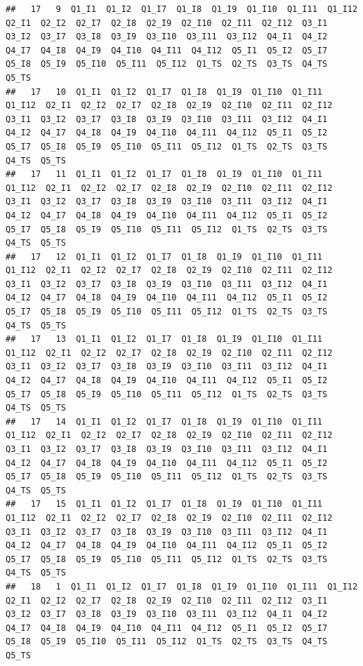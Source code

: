 \documentclass[
]{book}
\begin{document}
\begin{verbatim}
##   17   9  Q1_I1  Q1_I2  Q1_I7  Q1_I8  Q1_I9  Q1_I10  Q1_I11  Q1_I12  Q2_I1  Q2_I2  Q2_I7  Q2_I8  Q2_I9  Q2_I10  Q2_I11  Q2_I12  Q3_I1  Q3_I2  Q3_I7  Q3_I8  Q3_I9  Q3_I10  Q3_I11  Q3_I12  Q4_I1  Q4_I2  Q4_I7  Q4_I8  Q4_I9  Q4_I10  Q4_I11  Q4_I12  Q5_I1  Q5_I2  Q5_I7  Q5_I8  Q5_I9  Q5_I10  Q5_I11  Q5_I12  Q1_TS  Q2_TS  Q3_TS  Q4_TS  Q5_TS
##   17   10  Q1_I1  Q1_I2  Q1_I7  Q1_I8  Q1_I9  Q1_I10  Q1_I11  Q1_I12  Q2_I1  Q2_I2  Q2_I7  Q2_I8  Q2_I9  Q2_I10  Q2_I11  Q2_I12  Q3_I1  Q3_I2  Q3_I7  Q3_I8  Q3_I9  Q3_I10  Q3_I11  Q3_I12  Q4_I1  Q4_I2  Q4_I7  Q4_I8  Q4_I9  Q4_I10  Q4_I11  Q4_I12  Q5_I1  Q5_I2  Q5_I7  Q5_I8  Q5_I9  Q5_I10  Q5_I11  Q5_I12  Q1_TS  Q2_TS  Q3_TS  Q4_TS  Q5_TS
##   17   11  Q1_I1  Q1_I2  Q1_I7  Q1_I8  Q1_I9  Q1_I10  Q1_I11  Q1_I12  Q2_I1  Q2_I2  Q2_I7  Q2_I8  Q2_I9  Q2_I10  Q2_I11  Q2_I12  Q3_I1  Q3_I2  Q3_I7  Q3_I8  Q3_I9  Q3_I10  Q3_I11  Q3_I12  Q4_I1  Q4_I2  Q4_I7  Q4_I8  Q4_I9  Q4_I10  Q4_I11  Q4_I12  Q5_I1  Q5_I2  Q5_I7  Q5_I8  Q5_I9  Q5_I10  Q5_I11  Q5_I12  Q1_TS  Q2_TS  Q3_TS  Q4_TS  Q5_TS
##   17   12  Q1_I1  Q1_I2  Q1_I7  Q1_I8  Q1_I9  Q1_I10  Q1_I11  Q1_I12  Q2_I1  Q2_I2  Q2_I7  Q2_I8  Q2_I9  Q2_I10  Q2_I11  Q2_I12  Q3_I1  Q3_I2  Q3_I7  Q3_I8  Q3_I9  Q3_I10  Q3_I11  Q3_I12  Q4_I1  Q4_I2  Q4_I7  Q4_I8  Q4_I9  Q4_I10  Q4_I11  Q4_I12  Q5_I1  Q5_I2  Q5_I7  Q5_I8  Q5_I9  Q5_I10  Q5_I11  Q5_I12  Q1_TS  Q2_TS  Q3_TS  Q4_TS  Q5_TS
##   17   13  Q1_I1  Q1_I2  Q1_I7  Q1_I8  Q1_I9  Q1_I10  Q1_I11  Q1_I12  Q2_I1  Q2_I2  Q2_I7  Q2_I8  Q2_I9  Q2_I10  Q2_I11  Q2_I12  Q3_I1  Q3_I2  Q3_I7  Q3_I8  Q3_I9  Q3_I10  Q3_I11  Q3_I12  Q4_I1  Q4_I2  Q4_I7  Q4_I8  Q4_I9  Q4_I10  Q4_I11  Q4_I12  Q5_I1  Q5_I2  Q5_I7  Q5_I8  Q5_I9  Q5_I10  Q5_I11  Q5_I12  Q1_TS  Q2_TS  Q3_TS  Q4_TS  Q5_TS
##   17   14  Q1_I1  Q1_I2  Q1_I7  Q1_I8  Q1_I9  Q1_I10  Q1_I11  Q1_I12  Q2_I1  Q2_I2  Q2_I7  Q2_I8  Q2_I9  Q2_I10  Q2_I11  Q2_I12  Q3_I1  Q3_I2  Q3_I7  Q3_I8  Q3_I9  Q3_I10  Q3_I11  Q3_I12  Q4_I1  Q4_I2  Q4_I7  Q4_I8  Q4_I9  Q4_I10  Q4_I11  Q4_I12  Q5_I1  Q5_I2  Q5_I7  Q5_I8  Q5_I9  Q5_I10  Q5_I11  Q5_I12  Q1_TS  Q2_TS  Q3_TS  Q4_TS  Q5_TS
##   17   15  Q1_I1  Q1_I2  Q1_I7  Q1_I8  Q1_I9  Q1_I10  Q1_I11  Q1_I12  Q2_I1  Q2_I2  Q2_I7  Q2_I8  Q2_I9  Q2_I10  Q2_I11  Q2_I12  Q3_I1  Q3_I2  Q3_I7  Q3_I8  Q3_I9  Q3_I10  Q3_I11  Q3_I12  Q4_I1  Q4_I2  Q4_I7  Q4_I8  Q4_I9  Q4_I10  Q4_I11  Q4_I12  Q5_I1  Q5_I2  Q5_I7  Q5_I8  Q5_I9  Q5_I10  Q5_I11  Q5_I12  Q1_TS  Q2_TS  Q3_TS  Q4_TS  Q5_TS
##   18   1  Q1_I1  Q1_I2  Q1_I7  Q1_I8  Q1_I9  Q1_I10  Q1_I11  Q1_I12  Q2_I1  Q2_I2  Q2_I7  Q2_I8  Q2_I9  Q2_I10  Q2_I11  Q2_I12  Q3_I1  Q3_I2  Q3_I7  Q3_I8  Q3_I9  Q3_I10  Q3_I11  Q3_I12  Q4_I1  Q4_I2  Q4_I7  Q4_I8  Q4_I9  Q4_I10  Q4_I11  Q4_I12  Q5_I1  Q5_I2  Q5_I7  Q5_I8  Q5_I9  Q5_I10  Q5_I11  Q5_I12  Q1_TS  Q2_TS  Q3_TS  Q4_TS  Q5_TS

\end{verbatim}
\end{document}
